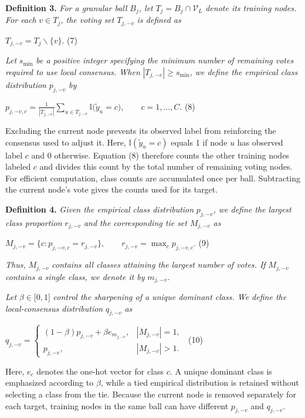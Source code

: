 \textbf{Definition 3.} \emph{For a granular ball} \(B_{j}\)\emph{, let} \(T_{j} = B_{j} \cap \mathcal{V}_{L}\) \emph{denote its training nodes. For each} \(v \in T_{j}\)\emph{, the voting set} \(T_{j, - v}\) \emph{is defined as}

\(T_{j, - v} = T_{j}\backslash\{ v\}.\) (7)

\emph{Let} \(s_{\min}\) \emph{be a positive integer specifying the minimum number of remaining votes required to use local consensus. When} \(\left| T_{j, - v} \right| \geq s_{\min}\)\emph{, we define the empirical class distribution} \(p_{j, - v}\) \emph{by}

\(p_{j, - v,c} = \frac{1}{|T_{j, - v}|}\sum_{u \in T_{j, - v}}^{}{\mathbb{I(}{\widetilde{y}}_{u} = c)},\quad\quad c = 1,\ldots,C.\) (8)

Excluding the current node prevents its observed label from reinforcing the consensus used to adjust it. Here, \(\mathbb{I}({\widetilde{y}}_{u} = c)\) equals 1 if node \(u\) has observed label \(c\) and 0 otherwise. Equation (8) therefore counts the other training nodes labeled \(c\) and divides this count by the total number of remaining voting nodes. For efficient computation, class counts are accumulated once per ball. Subtracting the current node's vote gives the counts used for its target.

\textbf{Definition 4.} \emph{Given the empirical class distribution} \(p_{j, - v}\)\emph{, we define the largest class proportion} \(r_{j, - v}\) \emph{and the corresponding tie set} \(M_{j, - v}\) \emph{as}

\(M_{j, - v} = \{ c:p_{j, - v,c} = r_{j, - v}\},\quad\quad r_{j, - v} = \max_{c}p_{j, - v,c}.\) (9)

\emph{Thus,} \(M_{j, - v}\) \emph{contains all classes attaining the largest number of votes. If} \(M_{j, - v}\) \emph{contains a single class, we denote it by} \(m_{j, - v}\)\emph{.}

\emph{Let} \(\beta \in \lbrack 0,1\rbrack\) \emph{control the sharpening of a unique dominant class. We define the local-consensus distribution} \(q_{j, - v}\) \emph{as}

\(q_{j, - v} = \left\{ \begin{matrix}
(1 - \beta)p_{j, - v} + \beta e_{m_{j, - v}}, & |M_{j, - v}| = 1, \\
p_{j, - v}, & |M_{j, - v}| > 1.
\end{matrix} \right.\ \) (10)

Here, \(e_{c}\) denotes the one-hot vector for class \(c\). A unique dominant class is emphasized according to \(\beta\), while a tied empirical distribution is retained without selecting a class from the tie. Because the current node is removed separately for each target, training nodes in the same ball can have different \(p_{j, - v}\) and \(q_{j, - v}\).


